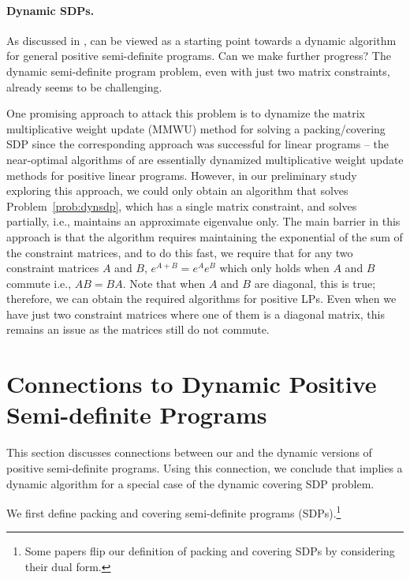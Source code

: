 \documentclass[11pt]{article}
\renewcommand\AA{\boldsymbol{\mathit{A}}}
\newcommand\BB{\boldsymbol{\mathit{B}}}
\begin{document}
\paragraph{Dynamic SDPs.}
As discussed in ,  can be viewed as a starting point towards a dynamic algorithm for general positive semi-definite programs. Can we make further progress? The dynamic semi-definite program problem, even with just two matrix constraints, already seems to be challenging. 

One promising approach to attack this problem is to dynamize the matrix multiplicative weight update (MMWU) method for solving a packing/covering SDP \cite{peng2012faster} since the corresponding approach was successful for linear programs -- the near-optimal algorithms of \cite{bhattacharya2023dynamic} are essentially dynamized multiplicative weight update methods for positive linear programs. However, in our preliminary study exploring this approach, we could only obtain an algorithm that solves Problem~\ref{prob:dynsdp}, which has a single matrix constraint, and  solves~ partially, i.e., maintains an approximate eigenvalue only. The main barrier in this approach is that the algorithm requires maintaining the exponential of the sum of the constraint matrices, and to do this fast, we require that for any two constraint matrices $\AA$ and $\BB$, $e^{\AA+\BB}= e^{\AA} e^{\BB}$ which only holds when $\AA$ and $\BB$ commute i.e., $\AA\BB = \BB\AA$. Note that when $\AA$ and $\BB$ are diagonal, this is true; therefore, we can obtain the required algorithms for positive LPs. Even when we have just two constraint matrices where one of them is a diagonal matrix, this remains an issue as the matrices still do not commute. 
 	 \newpage
	\printbibliography
	
	
	 \newpage
	\appendix
	\section{Connections to Dynamic Positive Semi-definite Programs}
\label{sec:dyn psd}
This section discusses connections between our  and the dynamic versions of positive semi-definite programs. Using this connection, we conclude that  implies a dynamic algorithm for a special case of the dynamic covering SDP problem. 

We first define packing and covering semi-definite programs (SDPs).\footnote{Some papers \cite{jambulapati2021positive} flip our definition of packing and covering SDPs by considering their dual form.}
\end{document}
